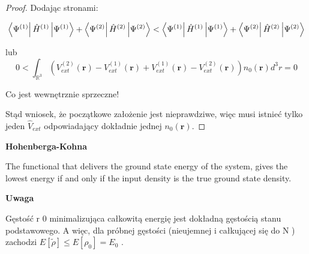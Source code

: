 \begin{proof}
Dodając stronami:

\[
\bra{\Psi^{(1)}}\hat{H}^{(1)}\ket{\Psi^{(1)}}+\bra{\Psi^{(2)}}\hat{H}^{(2)}\ket{\Psi^{(2)}}<\bra{\Psi^{(1)}}\hat{H}^{(1)}\ket{\Psi^{(1)}}+\bra{\Psi^{(2)}}\hat{H}^{(2)}\ket{\Psi^{(2)}}
\]


lub 
\[
0<\int_{\mathbb{R}^{3}}\left(V_{ext}^{(2)}\left(\boldsymbol{r}\right)-V_{ext}^{(1)}\left(\boldsymbol{r}\right)+V_{ext}^{(1)}\left(\boldsymbol{r}\right)-V_{ext}^{(2)}\left(\boldsymbol{r}\right)\right)n_{0}\left(\boldsymbol{r}\right)d^{3}r=0
\]


Co jest wewnętrznie sprzeczne!

Stąd wniosek, że początkowe założenie jest nieprawdziwe, więc musi
istnieć tylko jeden $\hat{V}_{ext}$ odpowiadający dokładnie jednej
$n_{0}\left(\boldsymbol{r}\right)$.\end{proof}
\begin{thm}
\textbf{Hohenberga-Kohna}

The functional that delivers the ground state energy of the system,
gives the lowest energy if and only if the input density is the true
ground state density.

\textbf{Uwaga}

Gęstość \textgreek{r} 0 minimalizująca całkowitą energię jest dokładną
gęstością stanu podstawowego. A więc, dla próbnej gęstości (nieujemnej
i całkującej się do N ) zachodzi $E\left[ \tilde{\rho} \right] \leq ­ E\left[ \rho_0 \right] = E_0$ .\end{thm}
